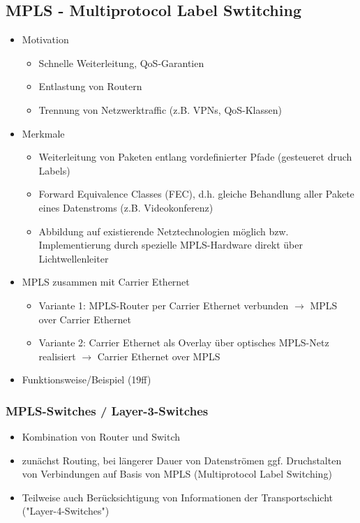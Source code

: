 \subsection{MPLS - Multiprotocol Label Swtitching}
\begin{itemize}
	\item Motivation
	\begin{itemize}
		\item Schnelle Weiterleitung, QoS-Garantien
		\item Entlastung von Routern
		\item Trennung von Netzwerktraffic (z.B. VPNs, QoS-Klassen)
	\end{itemize}
	\item Merkmale
	\begin{itemize}
		\item Weiterleitung von Paketen entlang vordefinierter Pfade (gesteueret druch Labels)
		\item Forward Equivalence Classes (FEC), d.h. gleiche Behandlung aller Pakete eines Datenstroms (z.B. Videokonferenz)
		\item Abbildung auf existierende Netztechnologien möglich bzw. Implementierung durch spezielle MPLS-Hardware direkt über Lichtwellenleiter
	\end{itemize}
	\item MPLS zusammen mit Carrier Ethernet
	\begin{itemize}
		\item Variante 1: MPLS-Router per Carrier Ethernet verbunden \(\to\) MPLS over Carrier Ethernet
		\item Variante 2: Carrier Ethernet als Overlay über optisches MPLS-Netz realisiert \(\to\) Carrier Ethernet over MPLS
	\end{itemize}
	\item Funktionsweise/Beispiel (19ff)
\end{itemize}
\subsubsection{MPLS-Switches / Layer-3-Switches}
\begin{itemize}
	\item Kombination von Router und Switch
	\item zunächst Routing, bei längerer Dauer von Datenströmen ggf. Druchstalten von Verbindungen auf Basis von MPLS (Multiprotocol Label Switching) 
	\item Teilweise auch Berücksichtigung von Informationen der Transportschicht ("Layer-4-Switches")
\end{itemize}
